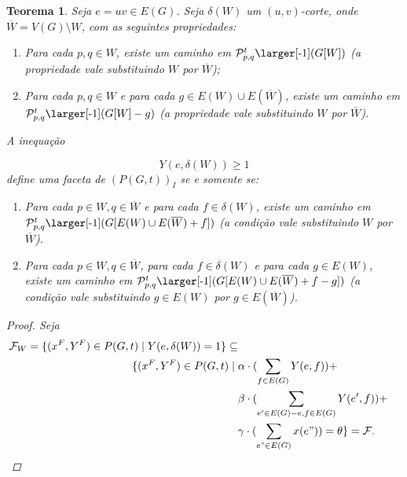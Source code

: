 \documentclass[11pt,reqno]{amsart}
\newcommand{\smallW}{\mbox{\larger[-1]$(G[W])$}}
\newcommand{\smallWg}{\mbox{\larger[-1]$(G[W]-g)$}}
\newcommand{\smallWWbarf}{\mbox{\larger[-1]$(G[E(W) \cup E(\overline{W})+f])$}}
\newcommand{\smallWWbarfg}{\mbox{\larger[-1]$(G[E(W) \cup E(\overline{W})+f-g])$}}
\newcommand{\spanPath}{\mathcal{P}}
\newcommand{\Pathpq}{\spanPath_{p,q}^{t}}
\newcommand{\PathpqW}{\Pathpq\smallW}
\newcommand{\PathpqWg}{\Pathpq\smallWg}
\newcommand{\PathpqWWbarf}{\Pathpq\smallWWbarf}
\newcommand{\PathpqWWbarfg}{\Pathpq\smallWWbarfg}
\newtheorem{teorema}{Teorema}
\newcommand{\facetF}{\mathcal{F}}
\begin{document}
\begin{teorema}
Seja $e = uv \in E(G)$. Seja $\delta(W)$ um $(u,v)$-corte, 
onde $\overline{W} = V(G) \setminus W$, com as seguintes propriedades: %

\begin{enumerate}
\item \label{fac_corte:cam_W}
Para cada $p,q \in W$, existe um caminho em $\PathpqW$ (a propriedade vale 
substituindo $W$ por $\overline{W}$);

\item \label{fac_corte:ponte_W}
Para cada $p,q \in W$ e para cada $g \in E(W) \cup E(\overline{W})$, existe um caminho em $\PathpqWg$ (a propriedade vale substituindo $W$ por 
$\overline{W}$).
\end{enumerate}

A inequação

\begin{equation*}
Y(e, \delta(W)) \ge 1
\end{equation*}
define uma faceta de $(P(G,t))_{I}$ se e somente se:

\begin{enumerate}


\item \label{fac_corte:cam_W_Wbar}
Para cada $p \in W, q \in \overline{W}$ e para cada 
$f \in \delta(W)$, existe um caminho em $\PathpqWWbarf$ (a condição vale 
substituindo $W$ por $\overline{W}$). 

\item \label{fac_corte:ponte_W_Wbar}
Para cada $p \in W,q \in \overline{W}$, para cada $f \in \delta(W)$ 
e para cada $g \in E(W)$, existe um caminho em $\PathpqWWbarfg$ (a condição vale substituindo 
$g \in E(W)$ por $g \in E(\overline{W})$). 
\end{enumerate}


\begin{proof}
Seja 
\begin{equation*}
\begin{split}
\facetF_{W} = \{(x^{F},Y^{F}) \in P(G,t)\; |\; Y(e,\delta(W)) = 1\} \subseteq \\ 
\{(x^{F},Y^{F}) \in P(G,t)\; |\; &\alpha \cdot (\sum_{f \in E(G)}Y(e,f)) + \\
 &\beta \cdot (\sum_{e' \in E(G) - e, f \in E(G)}Y(e',f)) +\\
 &\gamma \cdot (\sum_{e" \in E(G)}x(e")) = \theta\} = \facetF.
\end{split}
\end{equation*}


\end{proof}
\end{teorema}
\end{document}
